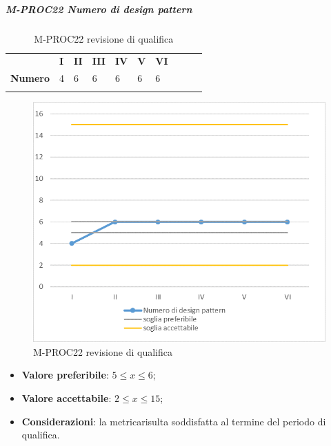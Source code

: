 \subparagraph{M-PROC22 Numero di design pattern} \mbox{}
\begin{longtable}[H!] {						
		>{}p{50mm}  		
		>{}p{8mm}
		>{}p{8mm}		
		>{}p{8mm}		
		>{}p{8mm}		
		>{}p{8mm}		
		>{}p{8mm}
		>{}p{8mm}
		>{}p{8mm}
		>{}p{8mm}
	}
	\rowcolor{gray!50}
	\textbf{} & \textbf{I} & \textbf{II} & \textbf{III} & \textbf{IV} & \textbf{V} & \textbf{VI} \TBstrut \\ [2mm]
	\textbf{Numero} & 4 & 6 & 6 & 6 & 6 & 6 \TBstrut \\ [2mm]
	\rowcolor{white}
	\caption{M-PROC22 revisione di qualifica}
\end{longtable}
\begin{figure}[H] 	
	\includegraphics[width=\linewidth]{./img/grafici/RQ22.png}	
	\caption{M-PROC22 revisione di qualifica}	
\end{figure}
\begin{itemize}
	\item \textbf{Valore preferibile}: $5\le x \le 6$;
	\item \textbf{Valore accettabile}: $2 \le x \le 15$;
	\item \textbf{Considerazioni}: la metrica\glosp risulta soddisfatta al termine del periodo di qualifica.
\end{itemize}

